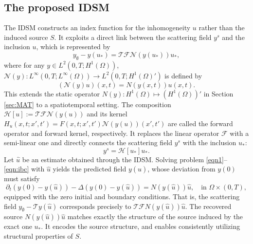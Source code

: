 \documentclass[onefignum,onetabnum]{siamart190516}
\numberwithin{equation}{section}
\begin{document}
\subsection{The proposed IDSM}
The IDSM constructs an index function for the inhomogeneity $u$ rather than the induced source $S$.
It exploits a direct link between the scattering field $y^{s}$ and the inclusion $u$, which is represented by 
\begin{equation*}
y_{\emptyset} - y(u_{*}) = \mathcal{T}\mathcal{F}\mathcal{N}(y(u_{*}))u_{*},
\end{equation*}
where for any $y \in L^{2}(0,T; H^{1}(\Omega))$, $\mathcal{N}(y): L^{\infty}(0,T; L^{\infty}(\Omega))\to L^{2}(0,T; H^{1}(\Omega)')$ is defined by
\begin{equation*}
\left(\mathcal{N}(y)u\right)(x, t) = N(y(x, t))u(x, t).
\end{equation*}
This extends the static operator $N(y)\colon H^{1}(\Omega) \mapsto (H^{1}(\Omega))'$ in Section \ref{sec:MAT} to a spatiotemporal setting.
The composition $\mathcal{H}[u]:=\mathcal{T}\mathcal{F}\mathcal{N}(y(u))$ and its kernel $H_{u}(x,t;x',t')=F(x,t;x',t')\mathcal{N}(y(u))(x',t')$ are called the forward operator and forward kernel, respectively.
It replaces the linear operator $\mathcal{F}$ with a semi-linear one and directly connects the scattering field $y^{s}$ with the inclusion $u_{*}$:
\begin{equation*}
y^{s}=\mathcal{H}[u_{*}]u_{*}.
\end{equation*}
Let $\hat{u}$ be an estimate obtained through the IDSM.
Solving problem \eqref{eqn1}--\eqref{eqn:ibc} with $\hat{u}$ yields the predicted field $y(\hat{u})$, whose deviation from $y(0)$ must satisfy
\begin{equation*}
\partial_{t} \left(y(0)-y(\hat{u})\right) - \Delta \left(y(0)-y(\hat{u})\right)=N(y(\hat{u}))\hat{u},\quad \text{in }\Omega\times (0,T),
\end{equation*}
equipped with the zero initial and boundary conditions.
That is, the scattering field $y_{\emptyset} - \mathcal{T}y(\hat{u})$ corresponds precisely to $\mathcal{T}\mathcal{F}N(y(\hat{u}))\hat{u}$.
The recovered source $N(y(\hat{u}))\hat{u}$ matches exactly the structure of the source induced by the exact one $u_{*}$.
It encodes the source structure, and enables consistently utilizing structural properties of $S$.
\end{document}
